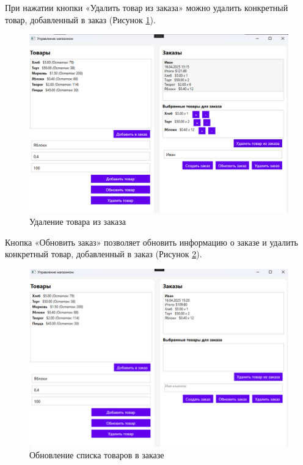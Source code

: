 \documentclass[12pt]{article}
\numberwithin{listing}{section}
\numberwithin{figure}{section}
\begin{document}
\pagebreak


При нажатии кнопки «Удалить товар из заказа» можно удалить конкретный товар, добавленный в заказ (Рисунок \ref{fig:demo7}).

\begin{figure}[ht]
	\centering
	\includegraphics[width=1.0\textwidth]{fig/image 64.png}
	\caption{Удаление товара из заказа}
	\label{fig:demo7}
\end{figure}

\pagebreak

Кнопка «Обновить заказ» позволяет обновить информацию о заказе и удалить конкретный товар, добавленный в заказ (Рисунок \ref{fig:demo8}).

\begin{figure}[ht]
	\centering
	\includegraphics[width=1.0\textwidth]{fig/image 65.png}
	\caption{Обновление списка товаров в заказе}
	\label{fig:demo8}
\end{figure}
\end{document}
